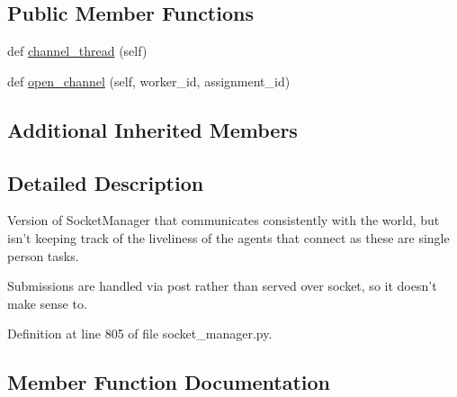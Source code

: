 \subsection*{Public Member Functions}
\begin{DoxyCompactItemize}
\item 
def \hyperlink{classparlai_1_1mturk_1_1core_1_1legacy__2018_1_1socket__manager_1_1StaticSocketManager_ab218ec2b7d77feca516140e8b64f769e}{channel\+\_\+thread} (self)
\item 
def \hyperlink{classparlai_1_1mturk_1_1core_1_1legacy__2018_1_1socket__manager_1_1StaticSocketManager_ac5de566ae19796033224e18fdd86e5b9}{open\+\_\+channel} (self, worker\+\_\+id, assignment\+\_\+id)
\end{DoxyCompactItemize}
\subsection*{Additional Inherited Members}


\subsection{Detailed Description}
\begin{DoxyVerb}Version of SocketManager that communicates consistently with the world, but isn't
keeping track of the liveliness of the agents that connect as these are single
person tasks.

Submissions are handled via post rather than served over socket, so it doesn't make
sense to.
\end{DoxyVerb}
 

Definition at line 805 of file socket\+\_\+manager.\+py.



\subsection{Member Function Documentation}
\mbox{\label{classparlai_1_1mturk_1_1core_1_1legacy__2018_1_1socket__manager_1_1StaticSocketManager_ab218ec2b7d77feca516140e8b64f769e}} 
